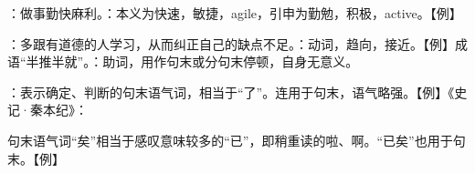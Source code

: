 {
\item {}：做事勤快麻利。：本义为快速，敏捷，agile，引申为勤勉，积极，active。【例】 
\item {}：多跟有道德的人学习，从而纠正自己的缺点不足。：动词，趋向，接近。【例】成语“半推半就”。：助词，用作句末或分句末停顿，自身无意义。
\item {}：表示确定、判断的句末语气词，相当于“了”。连用于句末，语气略强。【例】《史记·秦本纪》：

句末语气词“矣”相当于感叹意味较多的“已”，即稍重读的啦、啊。“已矣”也用于句末。【例】   
}
{}  %


